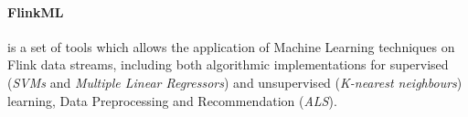 \paragraph{FlinkML} is a set of tools which allows the application of Machine Learning techniques on Flink data streams, including both algorithmic implementations for supervised (\textit{SVMs} and \textit{Multiple Linear Regressors}) and unsupervised (\textit{K-nearest neighbours}) learning, Data Preprocessing and Recommendation (\textit{ALS}).


